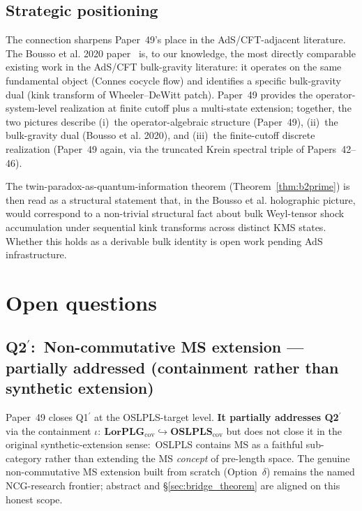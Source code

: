 \documentclass[11pt,a4paper]{article}
\theoremstyle{plain}
\theoremstyle{definition}
\begin{document}
\subsection{Strategic positioning}
\label{sec:bousso_positioning}

The connection sharpens Paper~49's place in the AdS/CFT-adjacent
literature. The Bousso et al. 2020 paper~\cite{bousso_casini_fisher_maldacena2020}
is, to our knowledge, the most directly comparable existing work in
the AdS/CFT bulk-gravity literature: it operates on the same
fundamental object (Connes cocycle flow) and identifies a specific
bulk-gravity dual (kink transform of Wheeler--DeWitt patch). Paper~49
provides the operator-system-level realization at finite cutoff plus
a multi-state extension; together, the two pictures describe (i)~the
operator-algebraic structure (Paper~49), (ii)~the bulk-gravity dual
(Bousso et al. 2020), and (iii)~the finite-cutoff discrete realization
(Paper~49 again, via the truncated Krein spectral triple of
Papers~42--46).

The twin-paradox-as-quantum-information theorem
(Theorem~\ref{thm:b2prime}) is then read as a structural statement
that, in the Bousso et al. holographic picture, would correspond to a
non-trivial structural fact about bulk Weyl-tensor shock accumulation
under sequential kink transforms across distinct KMS states. Whether
this holds as a derivable bulk identity is open work pending AdS
infrastructure.

\section{Open questions}\label{sec:open_questions}

\subsection{Q2$^{\prime}$:\ Non-commutative MS extension --- partially
addressed (containment rather than synthetic extension)}
\label{sec:open_q2prime}

Paper~49 closes Q1$^{\prime}$ at the OSLPLS-target level.
\textbf{It partially addresses Q2$^{\prime}$} via the containment
$\iota:\ \mathbf{LorPLG}_{\mathrm{cov}} \hookrightarrow
\mathbf{OSLPLS}_{\mathrm{cov}}$ but does not close it in the original
synthetic-extension sense:\ OSLPLS contains MS as a faithful
sub-category rather than extending the MS \emph{concept} of pre-length
space. The genuine non-commutative MS extension built from scratch
(Option~$\delta$) remains the named NCG-research frontier;
abstract and \S\ref{sec:bridge_theorem} are aligned on
this honest scope.
\end{document}
